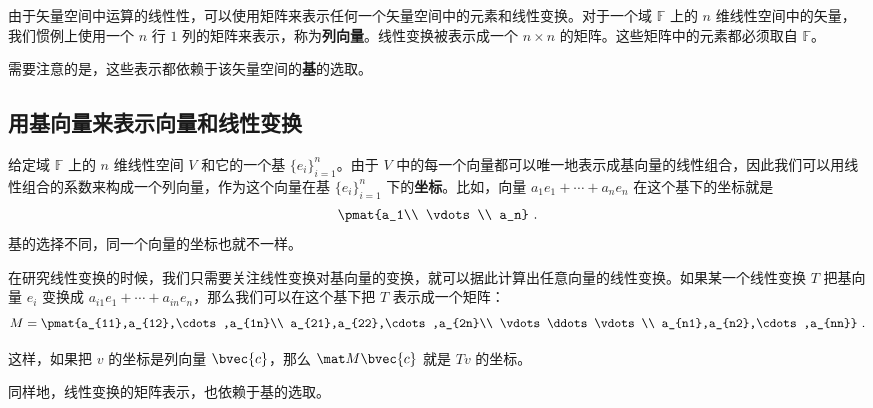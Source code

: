 
\begin{issues}
\end{issues}


由于矢量空间中运算的线性性，可以使用矩阵来表示任何一个矢量空间中的元素和线性变换。对于一个域 $\mathbb{F}$ 上的 $n$ 维线性空间中的矢量，我们惯例上使用一个 $n$ 行 $1$ 列的矩阵来表示，称为\textbf{列向量}。线性变换被表示成一个 $n\times n$ 的矩阵。这些矩阵中的元素都必须取自 $\mathbb{F}$。

需要注意的是，这些表示都依赖于该矢量空间的\textbf{基}的选取。


\subsection{用基向量来表示向量和线性变换}

给定域 $\mathbb{F}$ 上的 $n$ 维线性空间 $V$ 和它的一个基 $\{{e}_i\}_{i=1}^{n}$。由于 $V$ 中的每一个向量都可以唯一地表示成基向量的线性组合，因此我们可以用线性组合的系数来构成一个列向量，作为这个向量在基 $\{{e}_i\}_{i=1}^{n}$ 下的\textbf{坐标}。比如，向量 $a_1 {e}_1+\cdots+a_n {e}_n$ 在这个基下的坐标就是
\begin{equation}
\pmat{a_1\\ \vdots\\ a_n}~.
\end{equation}
基的选择不同，同一个向量的坐标也就不一样。

在研究线性变换的时候，我们只需要关注线性变换对基向量的变换，就可以据此计算出任意向量的线性变换。如果某一个线性变换 $T$ 把基向量 ${e}_i$ 变换成 $a_{i1} {e}_1+\cdots+a_{in} {e}_n$，那么我们可以在这个基下把 $T$ 表示成一个矩阵：
\begin{equation}
M=\pmat{a_{11},a_{12},\cdots,a_{1n}\\ a_{21},a_{22},\cdots,a_{2n}\\ \vdots\ddots\vdots\\ a_{n1},a_{n2},\cdots,a_{nn}}~.
\end{equation}

这样，如果把 ${v}$ 的坐标是列向量 $\bvec {c}$，那么 $\mat M\bvec{c}$ 就是 $T{v}$ 的坐标。

同样地，线性变换的矩阵表示，也依赖于基的选取。
